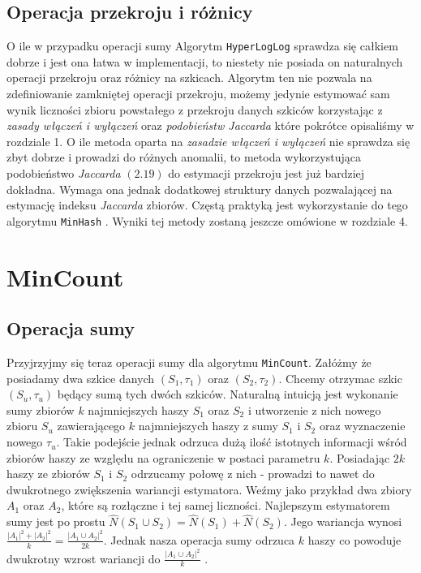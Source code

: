 \subsection{Operacja przekroju i różnicy}

O ile w przypadku operacji sumy Algorytm \texttt{HyperLogLog} sprawdza się całkiem dobrze i jest ona łatwa w implementacji, to niestety nie posiada on naturalnych operacji przekroju oraz różnicy na szkicach. Algorytm ten nie pozwala na zdefiniowanie zamkniętej operacji przekroju, możemy jedynie estymować sam wynik liczności zbioru powstałego z przekroju danych szkiców korzystając z \textit{zasady włączeń i wyłączeń} oraz \textit{podobieństw Jaccarda} które pokrótce opisaliśmy w rozdziale 1. O ile metoda oparta na \textit{zasadzie włączeń i wyłączeń} nie sprawdza się zbyt dobrze i prowadzi do różnych anomalii, to metoda wykorzystująca podobieństwo \textit{Jaccarda} $(2.19)$ do estymacji przekroju jest już bardziej dokładna. Wymaga ona jednak dodatkowej struktury danych pozwalającej na estymację indeksu \textit{Jaccarda} zbiorów. Częstą praktyką jest wykorzystanie do tego algorytmu \texttt{MinHash} \cite{adroll}. Wyniki tej metody zostaną jeszcze omówione w rozdziale 4.

\section{MinCount}

\subsection{Operacja sumy}

Przyjrzyjmy się teraz operacji sumy dla algorytmu \texttt{MinCount}. Załóżmy że posiadamy dwa szkice danych $(S_1, {\tau}_1)$ oraz $(S_2, {\tau}_2)$. Chcemy otrzymac szkic $(S_u, {\tau}_u)$ będący sumą tych dwóch szkiców. Naturalną intuicją jest wykonanie sumy zbiorów $k$ najmniejszych haszy $S_1$ oraz $S_2$ i utworzenie z nich nowego zbioru $S_u$ zawierającego $k$ najmniejszych haszy z sumy $S_1$ i $S_2$ oraz wyznaczenie nowego ${\tau}_u$. Takie podejście jednak odrzuca dużą ilość istotnych informacji wśród zbiorów haszy ze względu na ograniczenie w postaci parametru $k$. Posiadając $2k$ haszy ze zbiorów $S_1$ i $S_2$ odrzucamy połowę z nich - prowadzi to nawet do dwukrotnego zwiększenia wariancji estymatora. Weźmy jako przykład dwa zbiory $A_1$ oraz $A_2$, które są rozłączne i tej samej liczności. Najlepszym estymatorem sumy jest po prostu $\hat{N}(S_1 \cup S_2) = \hat{N}(S_1) + \hat{N}(S_2)$. Jego wariancja wynosi $\frac{|A_1|^2 + |A_2|^2}{k} = \frac{|A_1 \cup A_2|^2}{2k}$. Jednak nasza operacja sumy odrzuca $k$ haszy co powoduje dwukrotny wzrost wariancji do $\frac{|A_1 \cup A_2|^2}{k}$ \cite{ting}.

